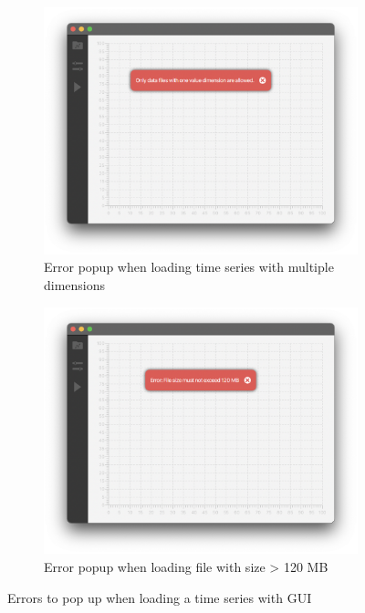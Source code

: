 \begin{figure}[ht]
    \centering
    \begin{subfigure}[b]{.48\textwidth}
        \centering
        \includegraphics[width=\textwidth]{fig/gui-dimension-error.png}
        \caption{Error popup when loading time series with multiple dimensions}
        \label{fig:gui-dimension-error}
    \end{subfigure}
    \hfill
    \begin{subfigure}[b]{.48\textwidth}
        \centering
        \includegraphics[width=\textwidth]{fig/gui-file-size-error.png}
        \caption{Error popup when loading file with size > 120 MB}
        \label{fig:gui-file-size-error}
    \end{subfigure}
    \caption{Errors to pop up when loading a time series with GUI}
    \label{fig:gui-loading-errors}
\end{figure}

